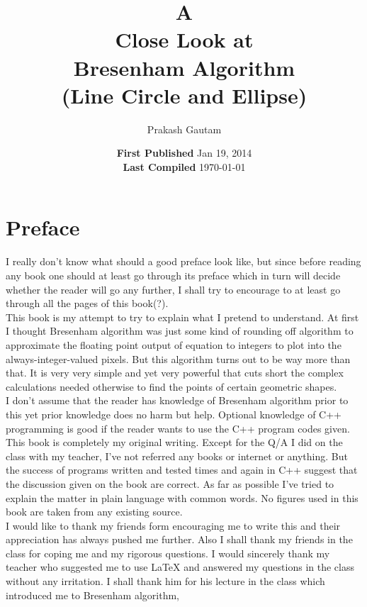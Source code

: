 \documentclass[a4paper,12pt,oneside]{book}
\author{Prakash Gautam}
\title{\Huge \vfill A\\Close Look at\\ Bresenham Algorithm\\  \small (Line Circle and Ellipse)}
\date{\vfill \textbf{First Published} Jan 19, 2014 \\ \textbf{Last Compiled}  \today}
\begin{document}
\begin{titlepage}
	\begin{center}
		\maketitle
 		\vfill
	\end{center}
\end{titlepage}
 
\tableofcontents
\vfill
\pagebreak



\section*{Preface}

I really don't know what should a good preface look like, but since before reading any book one should at least go through its preface which in turn will decide whether the reader will go any further, I shall try to encourage to at least go through all the pages of this book(?).\\

This book is my attempt to try to explain what I pretend to understand. At first I thought Bresenham algorithm was just some kind of rounding off algorithm to approximate the floating point output of equation to integers to plot into the always-integer-valued pixels. But this algorithm turns out to be way more than that. It is very very simple and yet very powerful that cuts short the complex calculations needed otherwise to find the points of certain geometric shapes.\\

I don't assume that the reader has knowledge of Bresenham algorithm prior to this yet prior knowledge does no harm but help. Optional knowledge of C++ programming is good if the reader wants to use the C++ program codes given.
\\ This book is completely my original writing. Except for the Q/A I did on the class with my teacher, I've not referred any books or internet or anything. But the success of programs written and tested times and again in C++ suggest that the discussion given on the book are correct. As far as possible I've tried to explain the matter in plain language with common words. No figures  used in this book are taken from any existing source.\\

I would like to thank my friends form encouraging me to write this and their appreciation has always pushed me further. Also I shall thank my friends in the class for coping me and my rigorous questions. I would sincerely thank my teacher who suggested me to use {\LaTeX} and answered my questions in the class without any irritation. I shall thank him for his lecture in the class which introduced me to Bresenham algorithm,\\
\end{document}
